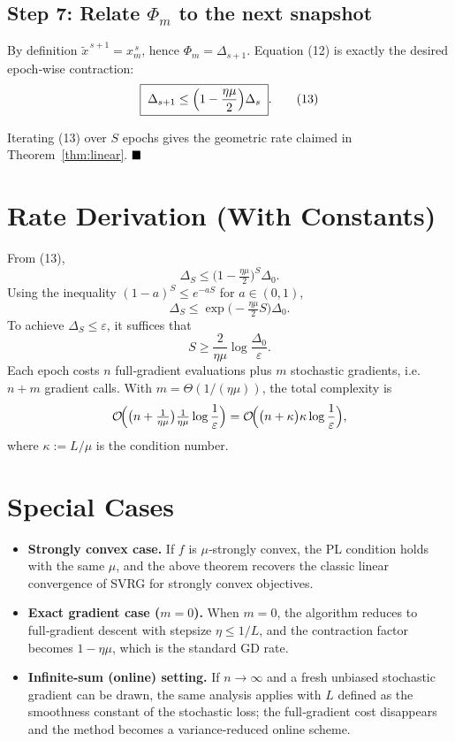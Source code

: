 \documentclass{article}
\begin{document}
\subsection*{Step 7: Relate $\Phi_m$ to the next snapshot}
By definition $\tilde{x}^{\,s+1}=x_m^{\,s}$, hence $\Phi_m=\Delta_{s+1}$. Equation (12) is exactly the desired epoch‑wise contraction:
\[
\boxed{\;\Delta_{s+1}\le\Bigl(1-\frac{\eta\mu}{2}\Bigr)\Delta_s\;}. \tag{13}
\]

Iterating (13) over $S$ epochs gives the geometric rate claimed in Theorem~\ref{thm:linear}. $\hfill\blacksquare$

\section*{Rate Derivation (With Constants)}
From (13),
\[
\Delta_S\le\bigl(1-\tfrac{\eta\mu}{2}\bigr)^{S}\Delta_0.
\]
Using the inequality $(1-a)^{S}\le e^{-aS}$ for $a\in(0,1)$,
\[
\Delta_S\le \exp\!\bigl(-\tfrac{\eta\mu}{2}S\bigr)\Delta_0.
\]
To achieve $\Delta_S\le\varepsilon$, it suffices that
\[
S\ge \frac{2}{\eta\mu}\log\!\frac{\Delta_0}{\varepsilon}.
\]
Each epoch costs $n$ full‑gradient evaluations plus $m$ stochastic gradients, i.e. $n+m$ gradient calls. With $m= \Theta(1/(\eta\mu))$, the total complexity is
\[
\mathcal{O}\!\Bigl(\bigl(n+\tfrac{1}{\eta\mu}\bigr)\tfrac{1}{\eta\mu}\log\frac{1}{\varepsilon}\Bigr)
=
\mathcal{O}\!\Bigl(\bigl(n+ \kappa\bigr)\kappa\log\frac{1}{\varepsilon}\Bigr),
\]
where $\kappa:=L/\mu$ is the condition number.

\section*{Special Cases}
\begin{itemize}
\item \textbf{Strongly convex case.} If $f$ is $\mu$‑strongly convex, the PL condition holds with the same $\mu$, and the above theorem recovers the classic linear convergence of SVRG for strongly convex objectives.
\item \textbf{Exact gradient case ($m=0$).} When $m=0$, the algorithm reduces to full‑gradient descent with stepsize $\eta\le 1/L$, and the contraction factor becomes $1-\eta\mu$, which is the standard GD rate.
\item \textbf{Infinite‑sum (online) setting.} If $n\to\infty$ and a fresh unbiased stochastic gradient can be drawn, the same analysis applies with $L$ defined as the smoothness constant of the stochastic loss; the full‑gradient cost disappears and the method becomes a variance‑reduced online scheme.
\end{itemize}
\end{document}
